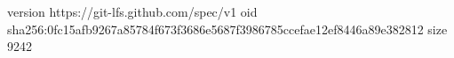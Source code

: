 version https://git-lfs.github.com/spec/v1
oid sha256:0fc15afb9267a85784f673f3686e5687f3986785ccefae12ef8446a89e382812
size 9242

